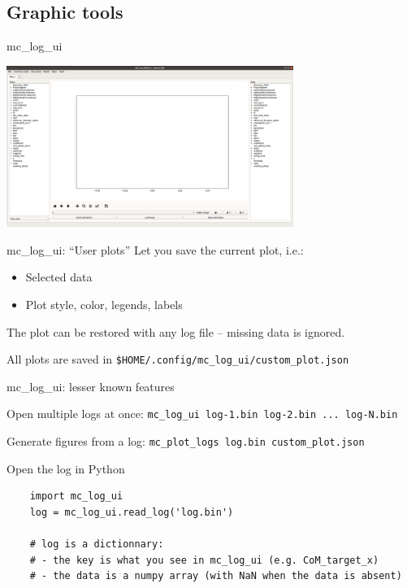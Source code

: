 \documentclass[c,aspectratio=169]{beamer}
\begin{document}
\subsection{Graphic tools}

\begin{frame}{mc\_log\_ui}

  \centering
  \includegraphics[width=0.7\textwidth]{img/mc_log_ui.png}

\end{frame}

\begin{frame}[fragile]{mc\_log\_ui: ``User plots''}
  Let you save the current plot, i.e.:
  \begin{itemize}
    \item Selected data
    \item Plot style, color, legends, labels
  \end{itemize}

  \vfill

  The plot can be restored with any log file -- missing data is ignored.

  \vfill

  All plots are saved in \verb|$HOME/.config/mc_log_ui/custom_plot.json|

\end{frame}

\begin{frame}[fragile]{mc\_log\_ui: lesser known features}

  Open multiple logs at once: \verb|mc_log_ui log-1.bin log-2.bin ... log-N.bin|

  \vfill

  Generate figures from a log: \verb|mc_plot_logs log.bin custom_plot.json|

  \vfill

  Open the log in Python

  \scriptsize
  \begin{verbatim}
    import mc_log_ui
    log = mc_log_ui.read_log('log.bin')

    # log is a dictionnary:
    # - the key is what you see in mc_log_ui (e.g. CoM_target_x)
    # - the data is a numpy array (with NaN when the data is absent)

  \end{verbatim}
\end{frame}
\end{document}
